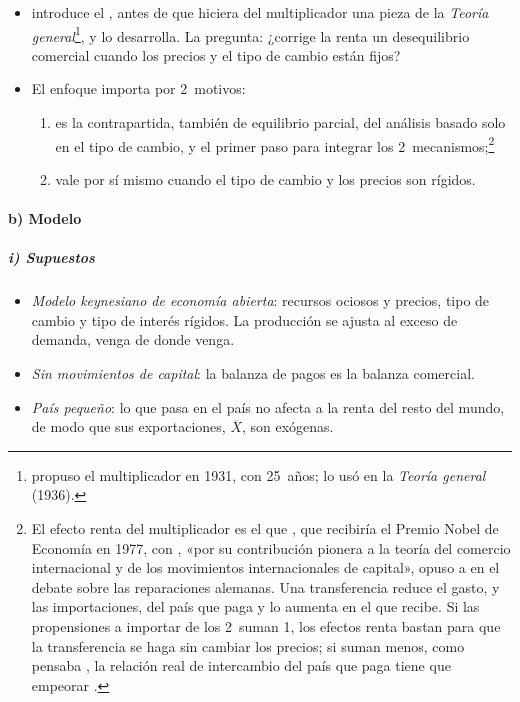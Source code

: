 \documentclass[11pt]{article}
\begin{document}
\begin{itemize}
\item \textcite{Harrod1933International} introduce el , antes de que  hiciera del multiplicador una pieza de la \emph{Teoría general}\footnote{ propuso el multiplicador en 1931, con 25~años;  lo usó en la \emph{Teoría general} (1936)\nocite{Kahn1931Relation}.}, y \textcite{Machlup1943International} lo desarrolla. La pregunta: ¿corrige la renta un desequilibrio comercial cuando los precios y el tipo de cambio están fijos?
\item El enfoque importa por 2~motivos:
  \begin{enumerate}
  \item es la contrapartida, también de equilibrio parcial, del análisis basado solo en el tipo de cambio, y el primer paso para integrar los 2~mecanismos;\footnote{El efecto renta del multiplicador es el que \textcite{Ohlin1929Reparation}, que recibiría el Premio Nobel de Economía en 1977, con , «por su contribución pionera a la teoría del comercio internacional y de los movimientos internacionales de capital»\nocite{Nobel1977MeadeOhlin}, opuso a \textcite{Keynes1929German} en el debate sobre las reparaciones alemanas. Una transferencia reduce el gasto, y las importaciones, del país que paga y lo aumenta en el que recibe. Si las propensiones a importar de los 2~suman 1, los efectos renta bastan para que la transferencia se haga sin cambiar los precios; si suman menos, como pensaba , la relación real de intercambio del país que paga tiene que empeorar .}
  \item vale por sí mismo cuando el tipo de cambio y los precios son rígidos.
  \end{enumerate}
\end{itemize}

\paragraph{b) Modelo}

\subparagraph{i) Supuestos}

\begin{itemize}
\item \emph{Modelo keynesiano de economía abierta}: recursos ociosos y precios, tipo de cambio y tipo de interés rígidos. La producción se ajusta al exceso de demanda, venga de donde venga.
\item \emph{Sin movimientos de capital}: la balanza de pagos es la balanza comercial.
\item \emph{País pequeño}: lo que pasa en el país no afecta a la renta del resto del mundo, de modo que sus exportaciones, $\overline X$, son exógenas.
\end{itemize}
\end{document}
